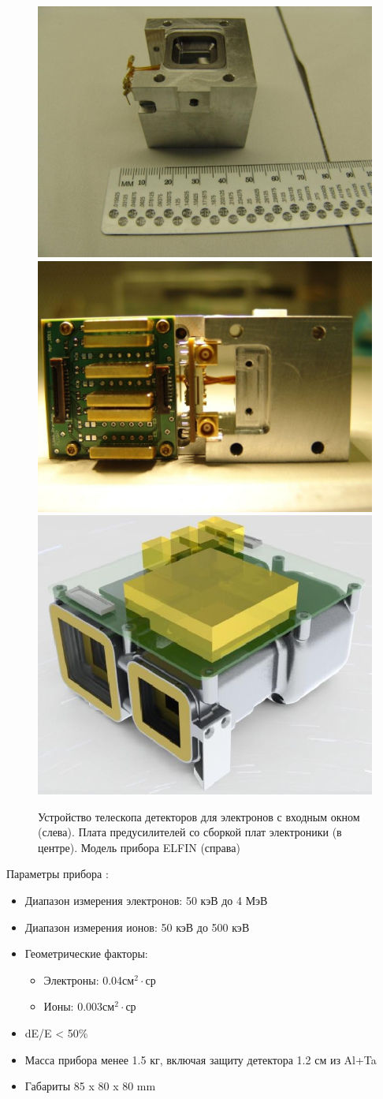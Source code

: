 \begin{figure}
	\centering
	\includegraphics[width=0.33\linewidth]{images/elfin/DSC04260}
	\includegraphics[width=0.33\linewidth]{images/elfin/DSC04287}
	\includegraphics[width=0.32\linewidth]{images/EPD_Brochure}
	\caption{Устройство телескопа детекторов для электронов с входным окном (слева). 	Плата предусилителей со сборкой плат электроники (в центре). Модель прибора ELFIN (справа) }
	\label{fig:dsc04260}
\end{figure}


Параметры прибора :
\begin{itemize}
	\item Диапазон измерения электронов: 50 кэВ до 4 МэВ
	
	\item Диапазон измерения ионов: 50 кэВ до 500 кэВ
	
	\item Геометрические факторы:
	
	\begin{itemize}
		\item Электроны: 0.04см$ ^{2}\cdot $ср
		
		\item Ионы: 0.003см$ ^{2}\cdot $ср
	\end{itemize}
	
	
	\item dE/E < 50\%
	
	\item Масса прибора менее 1.5 кг, включая защиту детектора 1.2 см из Al+Ta
	
	\item Габариты 85 x 80 x 80 mm
\end{itemize}

